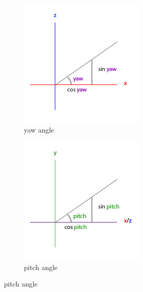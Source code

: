 \documentclass[12pt]{article}
\begin{document}
    \begin{figure}[!h]
      \begin{subfigure}{.5\textwidth}
        \centering
        \includegraphics[width=.8\linewidth]{images/camera_yaw_coord.png}
        \caption{yaw angle}
        \label{fig:sfig5}
      \end{subfigure}%
      \begin{subfigure}{.5\textwidth}
        \centering
        \includegraphics[width=.8\linewidth]{images/camera_pitch_coord.png}
        \caption{pitch angle}
        \label{fig:sfig6}
      \end{subfigure}
  \end{figure}
\end{document}

